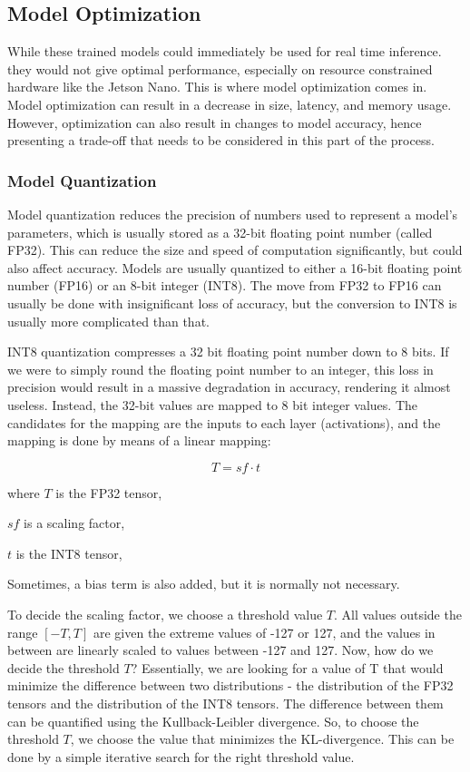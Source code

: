 \documentclass[12pt,letterpaper]{article}
\begin{document}
\subsection{Model Optimization}

While these trained models could immediately be used for real time inference. they would not give optimal performance, especially on resource constrained hardware like the Jetson Nano. This is where model optimization comes in. Model optimization can result in a decrease in size, latency, and memory usage. However, optimization can also result in changes to model accuracy, hence presenting a trade-off that needs to be considered in this part of the process.

\subsubsection{Model Quantization}

Model quantization reduces the precision of numbers used to represent a model's parameters, which is usually stored as a 32-bit floating point number (called FP32). This can reduce the size and speed of computation significantly, but could also affect accuracy. Models are usually quantized to either a 16-bit floating point number (FP16) or an 8-bit integer (INT8). The move from FP32 to FP16 can usually be done with insignificant loss of accuracy, but the conversion to INT8 is usually more complicated than that.

INT8 quantization compresses a 32 bit floating point number down to 8 bits. If we were to simply round the floating point number to an integer, this loss in precision would result in a massive degradation in accuracy, rendering it almost useless. Instead, the 32-bit values are mapped to 8 bit integer values. The candidates for the mapping are the inputs to each layer (activations), and the mapping is done by means of a linear mapping:

\[ T = sf \cdot t \]

where $T$ is the FP32 tensor,

$sf$ is a scaling factor,

$t$ is the INT8 tensor,

Sometimes, a bias term is also added, but it is normally not necessary.

To decide the scaling factor, we choose a threshold value $T$. All values outside the range $[-T,T]$ are given the extreme values of -127 or 127, and the values in between are linearly scaled to values between -127 and 127. Now, how do we decide the threshold $T$? Essentially, we are looking for a value of T that would minimize the difference between two distributions - the distribution of the FP32 tensors and the distribution of the INT8 tensors. The difference between them can be quantified using the Kullback-Leibler divergence. So, to choose the threshold $T$, we choose the value that minimizes the KL-divergence. This can be done by a simple iterative search for the right threshold value. 
\end{document}
